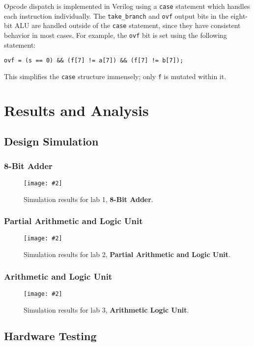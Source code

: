 \documentclass[12pt, letterpaper]{article}
\newcommand{\InsertImage}[3][\linewidth]{
	\begin{figure}[h]
		\centering
		\texttt{[image: \#2]}
		\caption{#3}
	\end{figure}
}
\newcommand{\InsertImageHere}[3][\linewidth]{
	\FloatBarrier
	\InsertImage[#1]{#2}{#3}
	\FloatBarrier
}
\begin{document}
Opcode dispatch is implemented in Verilog using a \texttt{case} statement which handles each instruction individually.  The \texttt{take\_branch} and \texttt{ovf} output bits in the eight-bit ALU are handled outside of the \texttt{case} statement, since they have consistent behavior in most cases.  For example, the \texttt{ovf} bit is set using the following statement:
\begin{lstlisting}[style=verilog-style]
	ovf = (s == 0) && (f[7] != a[7]) && (f[7] != b[7]);
\end{lstlisting}
This simplifies the \texttt{case} structure immensely; only \texttt{f} is mutated within it. 



\newpage
\section{Results and Analysis}



\subsection{Design Simulation}

\subsubsection{8-Bit Adder}

\InsertImageHere{images/simulations/lab1/simulation.png}{Simulation results for lab 1, \textbf{8-Bit Adder}.}

\subsubsection{Partial Arithmetic and Logic Unit}

\InsertImageHere{images/simulations/lab2/simulation.png}{Simulation results for lab 2, \textbf{Partial Arithmetic and Logic Unit}.}

\subsubsection{Arithmetic and Logic Unit}

\InsertImageHere{images/simulations/lab3/simulation.png}{Simulation results for lab 3, \textbf{Arithmetic Logic Unit}.}


\subsection{Hardware Testing}
\end{document}
